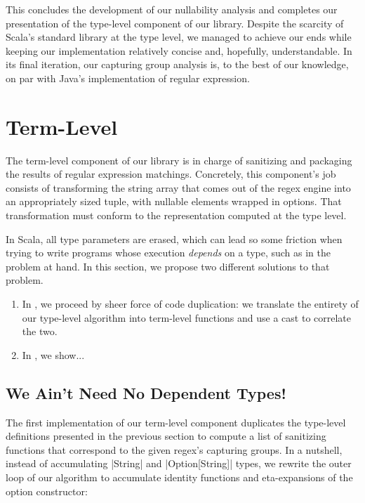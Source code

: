 This concludes the development of our nullability analysis and completes our presentation of the type-level component of our library.
Despite the scarcity of Scala's standard library at the type level, we managed to achieve our ends while keeping our implementation relatively concise and, hopefully, understandable.
In its final iteration, our capturing group analysis is, to the best of our knowledge, on par with Java's implementation of regular expression.

\section{Term-Level}
\label{sec:term-level}

The term-level component of our library is in charge of sanitizing and packaging the results of regular expression matchings.
Concretely, this component's job consists of transforming the string array that comes out of the regex engine into an appropriately sized tuple, with nullable elements wrapped in options.
That transformation must conform to the representation computed at the type level.

In Scala, all type parameters are erased, which can lead so some friction when trying to write programs whose execution \emph{depends} on a type, such as in the problem at hand. In this section, we propose two different solutions to that problem.

\begin{enumerate}
  \item In , we proceed by sheer force of code duplication: we translate the entirety of our type-level algorithm into term-level functions and use a cast to correlate the two.

  \item In , we show...
\end{enumerate}

\subsection{We Ain't Need No Dependent Types!}
\label{subsec:we-ain-t-need-no-dependent-types}

The first implementation of our term-level component duplicates the type-level definitions presented in the previous section to compute a list of sanitizing functions that correspond to the given regex's capturing groups.
In a nutshell, instead of accumulating |String| and |Option[String]| types, we rewrite the outer loop of our algorithm to accumulate identity functions and eta-expansions of the option constructor:

